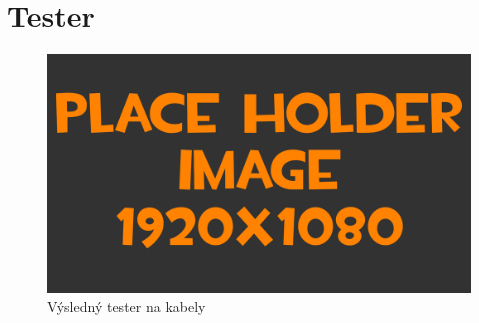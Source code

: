 
\section{Tester}
\begin{figure}[h!]
	\centering
	\includegraphics[width=\textwidth]{pictures/placeHolderFHD.png}
    	\caption{Výsledný tester na kabely}
   	\label{fig:tester}
\end{figure}

